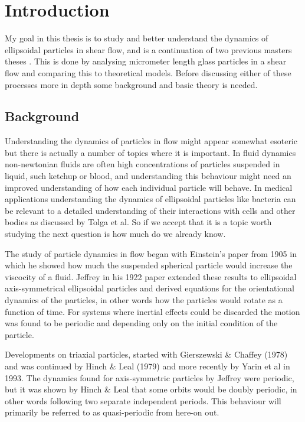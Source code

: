 \section{Introduction}
My goal in this thesis is to study and better understand the dynamics of ellipsoidal particles in shear flow, and is a continuation of two previous masters theses \cite{AntonThesis, JonasThesis}. This is done by analysing micrometer length glass particles in a shear flow and comparing this to theoretical models. Before discussing either of these processes more in depth some background and basic theory is needed.

\subsection{Background}
Understanding the dynamics of particles in flow might appear somewhat esoteric but there is actually a number of topics 
where it is important. In fluid dynamics non-newtonian fluids are often high concentrations of particles suspended in 
liquid, such ketchup or blood, and understanding this behaviour might need an improved understanding of how each 
individual particle will behave. In medical applications understanding the dynamics of ellipsoidal particles like 
bacteria can be relevant to a detailed understanding of their interactions with cells and other bodies as discussed by 
Tolga et al\cite{Tolga}. So if we accept that it is a topic worth studying the next question is how much do we already 
know.

The study of particle dynamics in flow began with Einstein's paper from 1905 \cite{Einstein} in which he showed how much the suspended spherical particle would increase the viscocity of a fluid. Jeffrey in his 1922 paper \cite{Jeffrey} extended these results to ellipsoidal axis-symmetrical ellipsoidal  particles and derived equations for the orientational dynamics of the particles, in other words how the particles would rotate as a function of time. For systems where inertial effects could be discarded the motion was found to be periodic and depending only on the initial condition of the particle. 

Developments on triaxial particles, started with Gierszewski \& Chaffey (1978)\cite{Chaffey} and was continued by Hinch \& Leal (1979)\cite{Leal} and more recently by Yarin et al in 1993\cite{Yarin}. 
The dynamics found for axis-symmetric particles by Jeffrey were periodic, but it was shown by Hinch \& Leal that some orbits would be doubly periodic, in other words following two separate independent periods. This behaviour will primarily be referred to as quasi-periodic from here-on out.

